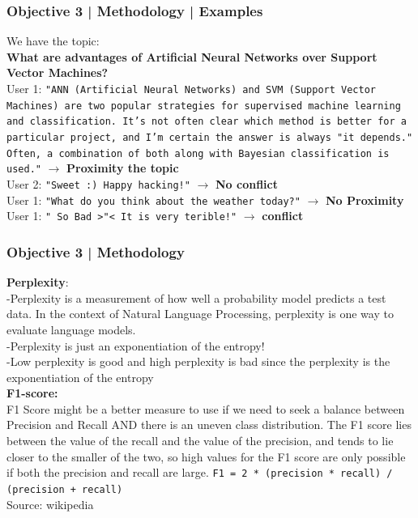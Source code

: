\documentclass{beamer}
\newcommand{\code}[1]{{\texttt{#1}}}
\begin{document}
\begin{frame}
\frametitle{Objective 3 | Methodology | Examples}
We have the topic: \\
{\tiny \textbf{What are advantages of Artificial Neural Networks over Support Vector Machines?} \\}
{\tiny User 1: \code{"ANN (Artificial Neural Networks) and SVM (Support Vector Machines) are two popular strategies for supervised machine learning and classification. It's not often clear which method is better for a particular project, and I'm certain the answer is always "it depends." Often, a combination of both along with Bayesian classification is used."} $\rightarrow$ \textbf{Proximity the topic }\\	
	User 2: \code{"Sweet :) Happy hacking!"} $\rightarrow$ \textbf{No conflict}\\	
	User 1: \code{"What do you think about the weather today?"}  $\rightarrow$\textbf{ No Proximity}\\		
		User 1: \code{" So Bad >"< It is very terible!"} $\rightarrow$ \textbf{conflict}\\
}

\end{frame}
\begin{frame}
\frametitle{Objective 3 | Methodology }
{\scriptsize \textbf{Perplexity}:\\
-Perplexity is a measurement of how well a probability model predicts a test data. In the context of Natural Language Processing, perplexity is one way to evaluate language models.\\
-Perplexity is just an exponentiation of the entropy!\\
-Low perplexity is good and high perplexity is bad since the perplexity is the exponentiation of the entropy \\
\textbf{F1-score:}\\
F1 Score might be a better measure to use if we need to seek a balance between Precision and Recall AND there is an uneven class distribution. The F1 score lies between the value of the recall and the value of the precision, and tends to lie closer to the smaller of the two, so high values for the F1 score are only possible if both the precision and recall are large. \code{F1 = 2 * (precision * recall) / (precision + recall)}} \\
{\tiny Source: wikipedia}
	\end{frame}
\end{document}
